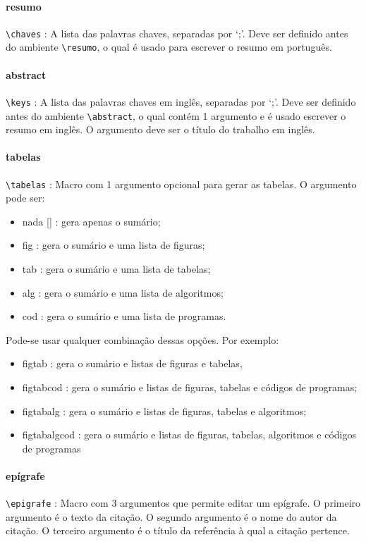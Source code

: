 \paragraph{resumo\\}
\verb|\chaves| : A lista das palavras chaves, separadas por `;'. Deve ser definido antes do ambiente \verb|\resumo|, o qual é usado para escrever o resumo em português.

\paragraph{abstract\\}
\verb|\keys| : A lista das palavras chaves em inglês, separadas por `;'. Deve ser definido antes do ambiente \verb|\abstract|, o qual contém 1 argumento e é usado escrever o resumo em inglês. O argumento deve ser o título do trabalho em inglês.

\paragraph{tabelas\\}
\verb|\tabelas| : Macro com 1 argumento opcional para gerar as tabelas. O argumento pode ser:
\begin{itemize}
 \item nada [] : gera apenas o sumário;
 \item \textsf{fig} : gera o sumário e uma lista de figuras;
 \item \textsf{tab} : gera o sumário e uma lista de tabelas;
 \item \textsf{alg} : gera o sumário e uma lista de algoritmos;
 \item \textsf{cod} : gera o sumário e uma lista de programas.
\end{itemize}

Pode-se usar qualquer combinação dessas opções. Por exemplo:
\begin{itemize}
 \item \textsf{figtab} : gera o sumário e listas de figuras e tabelas,
 \item \textsf{figtabcod} : gera o sumário e listas de figuras, tabelas e códigos de programas;
 \item \textsf{figtabalg} : gera o sumário e listas de figuras, tabelas e algoritmos;
 \item \textsf{figtabalgcod} : gera o sumário e listas de figuras, tabelas, algoritmos e códigos de programas
\end{itemize}

\paragraph{epígrafe\\}
\verb|\epigrafe| : Macro com 3 argumentos que permite editar um epígrafe. O primeiro argumento é o texto da citação. O segundo argumento é o nome do autor da citação. O terceiro argumento é o título da referência à qual a citação pertence.

